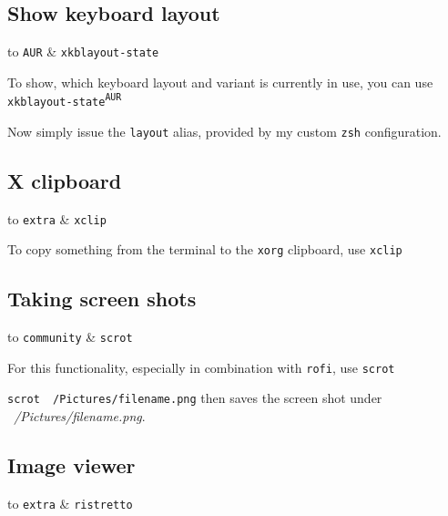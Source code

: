 \documentclass[9pt]{report}
\newenvironment{packagetable}
{\begin{longtabu}to \textwidth [b]{X[1,r]|X[1,l]}}
{\end{longtabu}}
\begin{document}
\newpage

\hypertarget{x-show-keyboard-layout}{\subsection{Show keyboard layout}}
\begin{packagetable}
    \texttt{AUR} & \texttt{xkblayout-state} \\ 
\end{packagetable}

To show, which keyboard layout and variant is currently in use, you can use \texttt{xkblayout-state\textsuperscript{\texttt{AUR}}}


Now simply issue the \texttt{layout} alias, provided by my custom \texttt{zsh} configuration.



\newpage

\hypertarget{x-x-clipboard}{\subsection{X clipboard}}
\begin{packagetable}
    \texttt{extra} & \texttt{xclip} \\ 
\end{packagetable}

To copy something from the terminal to the \texttt{xorg} clipboard, use \texttt{xclip}



\newpage

\hypertarget{x-taking-screen-shots}{\subsection{Taking screen shots}}
\begin{packagetable}
    \texttt{community} & \texttt{scrot} \\ 
\end{packagetable}

For this functionality, especially in combination with \texttt{rofi}, use \texttt{scrot}


\texttt{scrot ~/Pictures/filename.png} then saves the screen shot under \textit{~/Pictures/filename.png}.



\newpage

\hypertarget{x-image-viewer}{\subsection{Image viewer}}
\begin{packagetable}
    \texttt{extra} & \texttt{ristretto} \\ 
\end{packagetable}
\end{document}

